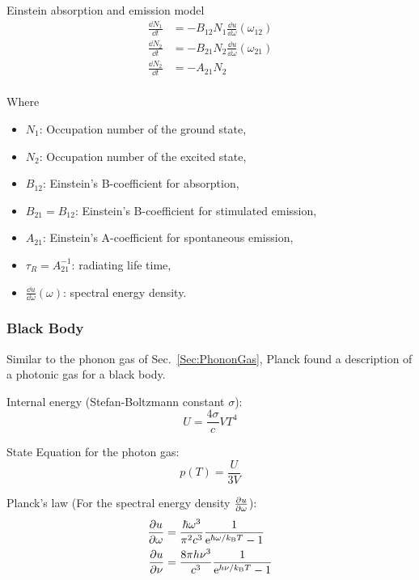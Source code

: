 			\noindent
			Einstein absorption and emission model
			\begin{equation}
				\begin{aligned}
					\frac{\dd N_1}{\dd t} &= -B_{12}N_1 \frac{\dd u}{\dd \omega}(\omega_{12}) \\
					\frac{\dd N_2}{\dd t} &= -B_{21}N_2 \frac{\dd u}{\dd \omega}(\omega_{21}) \\
					\frac{\dd N_2}{\dd t} &= -A_{21}N_2\\
				\end{aligned}
			\end{equation}

			\noindent
			Where
			\begin{itemize}
				\setlength\itemsep{0pt}
				\item[] $N_1$: Occupation number of the ground state,
				\item[] $N_2$: Occupation number of the excited state,
				\item[] $B_{12}$: Einstein's B-coefficient for absorption,
				\item[] $B_{21} = B_{12}$: Einstein's B-coefficient for stimulated emission,
				\item[] $A_{21}$: Einstein's A-coefficient for spontaneous emission,
				\item[] $\tau_{R}=A_{21}^{-1}$: radiating life time,
				\item[] $\frac{\dd u}{\dd \omega}(\omega)$: spectral energy density.
			\end{itemize}

		\subsubsection{Black Body}
			\noindent
			Similar to the phonon gas of Sec.~\ref{Sec:PhononGas}, Planck found a description of a photonic gas for a black body. \vsp

			\noindent
			Internal energy (Stefan-Boltzmann constant $\sigma$):
			\begin{equation}
				U = \frac{4\sigma}{c} V T^4
			\end{equation}

			\noindent
			State Equation for the photon gas:
			\begin{equation}
				p(T) = \frac{U}{3V}
			\end{equation}

			\noindent
			Planck's law (For the spectral energy density $\pdv{u}{\omega}$):
			\begin{equation}
				\begin{aligned}
					\pdv{u}{\omega}(\omega,T) &= \frac{\hbar \omega^3}{\pi^2 c^3} \frac{1}{\mathrm{e}^{\hbar \omega / k_{\text{B}} T} - 1} \\
					\pdv{u}{\nu} (\nu, T) &= \frac{8 \pi h \nu^3}{c^3} \frac{1}{\mathrm{e}^{h \nu / k_{\text{B}} T} - 1} \\
				\end{aligned}
			\end{equation}

